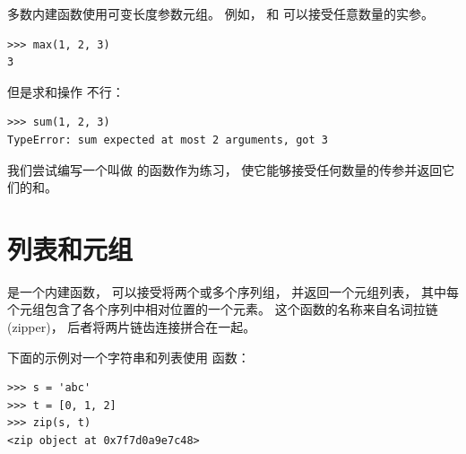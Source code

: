 {多数内建函数使用可变长度参数元组。
例如，  和   可以接受任意数量的实参。

 
 

\begin{lstlisting}
>>> max(1, 2, 3)
3
\end{lstlisting}

%

但是求和操作  不行：
 

\begin{lstlisting}
>>> sum(1, 2, 3)
TypeError: sum expected at most 2 arguments, got 3
\end{lstlisting}

%

我们尝试编写一个叫做  的函数作为练习，
使它能够接受任何数量的传参并返回它们的和。


\section{列表和元组}
 


  是一个内建函数， 可以接受将两个或多个序列组， 并返回一个元组列表，
其中每个元组包含了各个序列中相对位置的一个元素。
这个函数的名称来自名词拉链 (zipper)， 后者将两片链齿连接拼合在一起。



下面的示例对一个字符串和列表使用  函数：

\begin{lstlisting}
>>> s = 'abc'
>>> t = [0, 1, 2]
>>> zip(s, t)
<zip object at 0x7f7d0a9e7c48>
\end{lstlisting}

%

}
